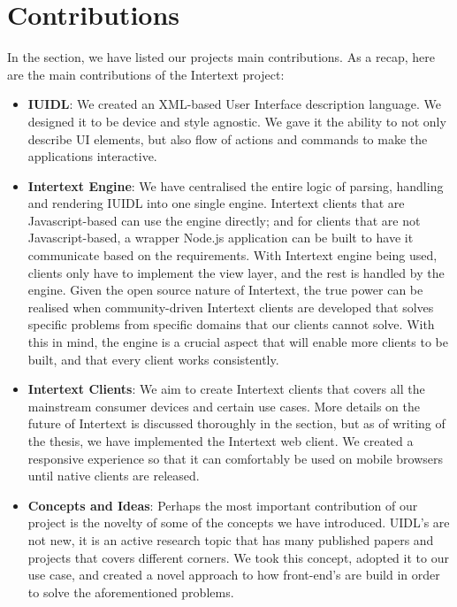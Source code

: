 \section{Contributions}

In the  section, we have listed our projects main contributions. As a recap, here are the main contributions of the Intertext project:

\begin{itemize}
    
    \item \textbf{IUIDL}: We created an XML-based User Interface description language. We designed it to be device and style agnostic. We gave it the ability to not only describe UI elements, but also flow of actions and commands to make the applications interactive.
    
    \item \textbf{Intertext Engine}: We have centralised the entire logic of parsing, handling and rendering IUIDL into one single engine. Intertext clients that are Javascript-based can use the engine directly; and for clients that are not Javascript-based, a wrapper Node.js application can be built to have it communicate based on the requirements. With Intertext engine being used, clients only have to implement the view layer, and the rest is handled by the engine. Given the open source nature of Intertext, the true power can be realised when community-driven Intertext clients are developed that solves specific problems from specific domains that our clients cannot solve. With this in mind, the engine is a crucial aspect that will enable more clients to be built, and that every client works consistently. 
    
    \item \textbf{Intertext Clients}: We aim to create Intertext clients that covers all the mainstream consumer devices and certain use cases. More details on the future of Intertext is discussed thoroughly in the  section, but as of writing of the thesis, we have implemented the Intertext web client. We created a responsive experience so that it can comfortably be used on mobile browsers until native clients are released.
    
    \item \textbf{Concepts and Ideas}: Perhaps the most important contribution of our project is the novelty of some of the concepts we have introduced. UIDL's are not new, it is an active research topic that has many published papers and projects that covers different corners. We took this concept, adopted it to our use case, and created a novel approach to how front-end's are build in order to solve the aforementioned problems.

\end{itemize}


